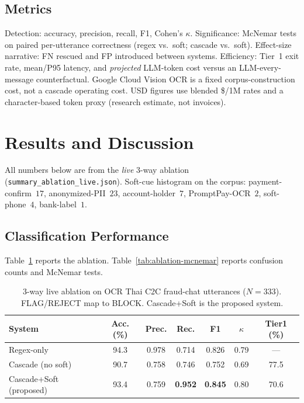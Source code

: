 \documentclass[conference]{IEEEtran}
\begin{document}
\subsection{Metrics}
Detection: accuracy, precision, recall, F1, Cohen's $\kappa$. Significance:
McNemar tests on paired per-utterance correctness (regex vs.\ soft; cascade vs.\
soft). Effect-size narrative: FN rescued and FP introduced between systems.
Efficiency: Tier~1 exit rate, mean/P95 latency, and \emph{projected} LLM-token
cost versus an LLM-every-message counterfactual. Google Cloud Vision OCR is a
fixed corpus-construction cost, not a cascade operating cost. USD figures use
blended \$/1M rates and a character-based token proxy (research estimate, not
invoices).

\section{Results and Discussion}

All numbers below are from the \emph{live} 3-way ablation
(\texttt{summary\_ablation\_live.json}). Soft-cue histogram on the corpus:
payment-confirm~$17$, anonymized-PII~$23$, account-holder~$7$,
PromptPay-OCR~$2$, soft-phone~$4$, bank-label~$1$.

\subsection{Classification Performance}
Table~\ref{tab:ablation-detection} reports the ablation.
Table~\ref{tab:ablation-mcnemar} reports confusion counts and McNemar tests.

\begin{table}[t]
\centering
\caption{3-way live ablation on OCR Thai C2C fraud-chat utterances ($N{=}333$).
FLAG/REJECT map to BLOCK. Cascade+Soft is the proposed system.}
\label{tab:ablation-detection}
\begin{tabular}{lcccccc}
\toprule
System & Acc. (\%) & Prec. & Rec. & F1 & $\kappa$ & Tier1 (\%) \\
\midrule
Regex-only & 94.3 & 0.978 & 0.714 & 0.826 & 0.79 & --- \\
Cascade (no soft) & 90.7 & 0.758 & 0.746 & 0.752 & 0.69 & 77.5 \\
Cascade+Soft (proposed) & 93.4 & 0.759 & \textbf{0.952} & \textbf{0.845} & 0.80 & 70.6 \\
\bottomrule
\end{tabular}
\end{table}
\end{document}
